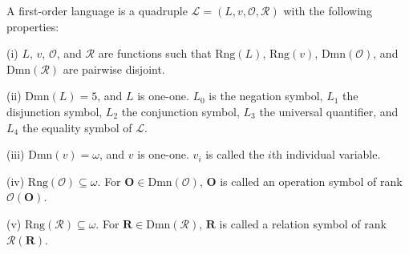 A first-order language is a quadruple $\mathcal{L} = (L, v, \mathcal{O}, \mathcal{R})$ with the following properties:

(i) $L$, $v$, $\mathcal{O}$, and $\mathcal{R}$ are functions such that $\text{Rng}(L)$, $\text{Rng}(v)$, $\text{Dmn}(\mathcal{O})$, and $\text{Dmn}(\mathcal{R})$ are pairwise disjoint.

(ii) $\text{Dmn}(L) = 5$, and $L$ is one-one. $L_0$ is the negation symbol, $L_1$ the disjunction symbol, $L_2$ the conjunction symbol, $L_3$ the universal quantifier, and $L_4$ the equality symbol of $\mathcal{L}$.

(iii) $\text{Dmn}(v) = \omega$, and $v$ is one-one. $v_i$ is called the $i$th individual variable.

(iv) $\text{Rng}(\mathcal{O}) \subseteq \omega$. For $\mathbf{O} \in \text{Dmn}(\mathcal{O})$, $\mathbf{O}$ is called an operation symbol of rank $\mathcal{O}(\mathbf{O})$.

(v) $\text{Rng}(\mathcal{R}) \subseteq \omega$. For $\mathbf{R} \in \text{Dmn}(\mathcal{R})$, $\mathbf{R}$ is called a relation symbol of rank $\mathcal{R}(\mathbf{R})$.
